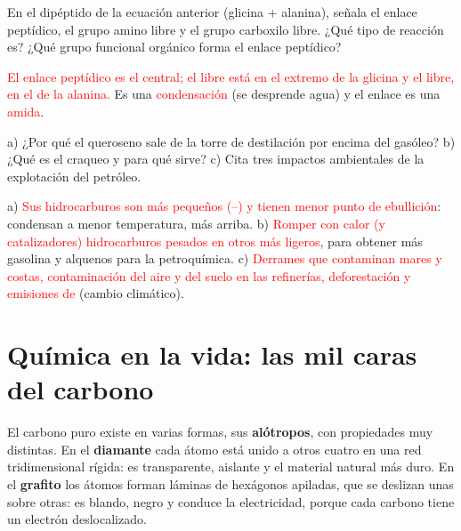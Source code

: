 \begin{exercise}
    En el dipéptido de la ecuación anterior (glicina + alanina), señala el enlace peptídico, el grupo amino libre y el grupo
    carboxilo libre. ¿Qué tipo de reacción es? ¿Qué grupo funcional orgánico forma el enlace peptídico?
    \begin{solu}
        \textcolor{red}{El enlace peptídico es el  central; el  libre está en el extremo de la glicina y el
         libre, en el de la alanina.} Es una \textcolor{red}{condensación} (se desprende agua) y el enlace es una
        \textcolor{red}{amida}.
    \end{solu}
\end{exercise}

\begin{exercise}
    a) ¿Por qué el queroseno sale de la torre de destilación por encima del gasóleo? b) ¿Qué es el craqueo y para qué sirve? c) Cita
    tres impactos ambientales de la explotación del petróleo.
    \begin{solu}
        a) \textcolor{red}{Sus hidrocarburos son más pequeños (--) y tienen menor punto de ebullición}: condensan a
        menor temperatura, más arriba. b) \textcolor{red}{Romper con calor (y catalizadores) hidrocarburos pesados en otros más
        ligeros}, para obtener más gasolina y alquenos para la petroquímica. c) \textcolor{red}{Derrames que contaminan mares y
        costas, contaminación del aire y del suelo en las refinerías, deforestación y emisiones de } (cambio climático).
    \end{solu}
\end{exercise}

\section{Química en la vida: las mil caras del carbono}\label{sec:ud7-alotropos}

El carbono puro existe en varias formas, sus \textbf{alótropos}, con propiedades muy distintas. En el \textbf{diamante} cada átomo
está unido a otros cuatro en una red tridimensional rígida: es transparente, aislante y el material natural más duro. En el
\textbf{grafito} los átomos forman láminas de hexágonos apiladas, que se deslizan unas sobre otras: es blando, negro y conduce la
electricidad, porque cada carbono tiene un electrón deslocalizado.

